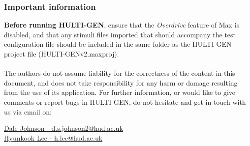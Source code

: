 \subsubsection{Important information}
\textbf{Before running HULTI-GEN}, ensure that the \textit{Overdrive} feature of Max is disabled, and that any stimuli files imported that should accompany the test configuration file should be included in the same folder as the HULTI-GEN project file (HULTI-GENv2.maxproj).
\\
\\
The authors do not assume liability for the correctness of the content in this document, and does not take responsibility for any harm or damage resulting from the use of its application. For further information, or would like to give comments or report bugs in HULTI-GEN, do not hesitate and get in touch with us via email on:
\begin{center}
\href{mailto::d.s.johnson2@hud.ac.uk}{Dale Johnson - d.s.johnson2@hud.ac.uk}
\\
\href{mailto::h.lee@hud.ac.uk}{Hyunkook Lee - h.lee@hud.ac.uk}
\end{center}
